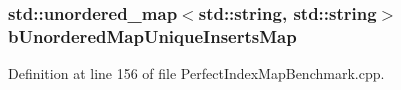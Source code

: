 \subsubsection[{b\+Unordered\+Map\+Unique\+Inserts\+Map}]{\setlength{\rightskip}{0pt plus 5cm}std\+::unordered\+\_\+map$<$std\+::string, std\+::string$>$ b\+Unordered\+Map\+Unique\+Inserts\+Map}\label{PerfectIndexMapBenchmark_8cpp_a23ecc55bc3f8970d6314c84eaf8b8a26}


Definition at line 156 of file Perfect\+Index\+Map\+Benchmark.\+cpp.

